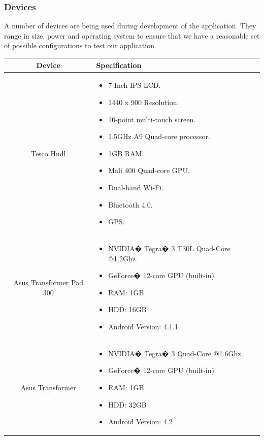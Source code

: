 \documentclass[11pt,a4paper]{article}
\begin{document}
\subsubsection{Devices}
A number of devices are being used during development of the application. They range in size, power and operating system to ensure that we have a reasonable set of possible configurations to test our application.

\begin{center}
\begin{tabular}{c|p{8cm}}
\textbf{Device} & \textbf{Specification} \\ \hline
Tesco Hudl & \begin{itemize}
\item 7 Inch IPS LCD.
\item 1440 x 900 Resolution.
\item 10-point multi-touch screen.
\item 1.5GHz A9 Quad-core processor.
\item 1GB RAM.
\item Mali 400 Quad-core GPU.
\item Dual-band Wi-Fi.
\item Bluetooth 4.0.
\item GPS.
\end{itemize} \\ \hline
Asus Transformer Pad 300 & 	\begin{itemize}
	\item NVIDIA� Tegra� 3 T30L Quad-Core @1.2Ghz
	\item GeForce� 12-core GPU (built-in)
	\item RAM: 1GB
	\item HDD: 16GB
	\item Android Version: 4.1.1
	\end{itemize} \\ \hline
Asus Transformer & \begin{itemize}
	\item NVIDIA� Tegra� 3 Quad-Core @1.6Ghz
	\item GeForce� 12-core GPU (built-in)
	\item RAM: 1GB
	\item HDD: 32GB
	\item Android Version: 4.2
\end{itemize} \\ \hline

\end{tabular}
\end{center}
\end{document}
